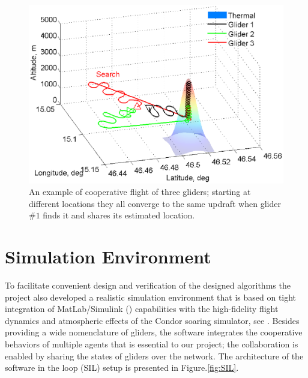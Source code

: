 \documentclass{ifacconf}
\newcommand{\squeezeup}{\vspace{-2.0mm}}
\begin{document}
\begin{figure}[thpb]
  \centering
  \includegraphics[scale=0.45]{Figures/paths_cooperative_flight.eps}
  \caption{An example of cooperative flight of three gliders; starting at different locations they
  all converge to the same updraft when glider $\#1$ finds it and shares its estimated location.}
  \label{fig:CoopFlightPaths}
\end{figure}

\section{Simulation Environment}
\label{sec:SimEnv}
\squeezeup

To facilitate convenient design and verification of the designed algorithms the project
also developed a realistic simulation environment that is based on tight integration of
MatLab/Simulink (\cite{MATLAB:2013}) capabilities with the high-fidelity flight dynamics
and atmospheric effects of the Condor soaring simulator, see \cite{Condor:2013:Online}.
Besides providing a wide nomenclature of gliders, the software integrates the cooperative
behaviors of multiple agents that is essential to our project; the collaboration is
enabled by sharing the states of gliders over the network. The architecture of the
software in the loop (SIL) setup is presented in Figure.\ref{fig:SIL}.
%
\end{document}
